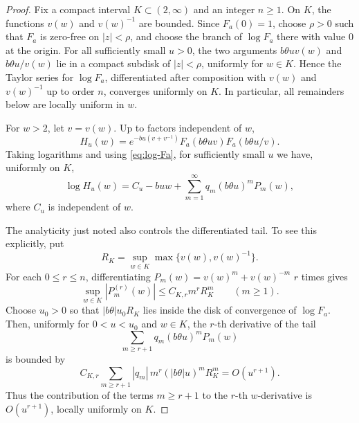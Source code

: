 \documentclass[10pt,a4paper]{amsart}
\begin{document}
\begin{proof}
Fix a compact interval \(K\subset(2,\infty)\) and an integer \(n\ge1\).  On \(K\), the functions \(v(w)\) and \(v(w)^{-1}\) are bounded.  Since \(F_a(0)=1\), choose \(\rho>0\) such that \(F_a\) is zero-free on \(|z|<\rho\), and choose the branch of \(\log F_a\) there with value \(0\) at the origin.  For all sufficiently small \(u>0\), the two arguments \(b\theta uv(w)\) and \(b\theta u/v(w)\) lie in a compact subdisk of \(|z|<\rho\), uniformly for \(w\in K\).  Hence the Taylor series for \(\log F_a\), differentiated after composition with \(v(w)\) and \(v(w)^{-1}\) up to order \(n\), converges uniformly on \(K\).  In particular, all remainders below are locally uniform in \(w\).

For \(w>2\), let \(v=v(w)\).  Up to factors independent of \(w\),
\begin{equation}
H_u(w)
=
e^{-bu(v+v^{-1})}
F_a(b\theta uv)F_a(b\theta u/v).
\end{equation}
Taking logarithms and using \eqref{eq:log-Fa}, for sufficiently small \(u\) we have, uniformly on \(K\),
\begin{equation}
\log H_u(w)
=
C_u-buw+
\sum_{m=1}^{\infty}q_m(b\theta u)^mP_m(w),
\end{equation}
where \(C_u\) is independent of \(w\).

The analyticity just noted also controls the differentiated tail.  To see this explicitly, put
\begin{equation}
R_K=\sup_{w\in K}\max\{v(w),v(w)^{-1}\}.
\end{equation}
For each \(0\le r\le n\), differentiating \(P_m(w)=v(w)^m+v(w)^{-m}\) \(r\) times gives
\begin{equation}
\sup_{w\in K}|P_m^{(r)}(w)|
\le C_{K,r}m^rR_K^m
\qquad(m\ge1).
\end{equation}
Choose \(u_0>0\) so that \(|b\theta|u_0R_K\) lies inside the disk of convergence of \(\log F_a\).  Then, uniformly for \(0<u<u_0\) and \(w\in K\), the \(r\)-th derivative of the tail
\begin{equation}
\sum_{m\ge r+1}q_m(b\theta u)^mP_m(w)
\end{equation}
is bounded by
\begin{equation}
C_{K,r}\sum_{m\ge r+1}|q_m|\,m^r(|b\theta|u)^mR_K^m
=O(u^{r+1}).
\end{equation}
Thus the contribution of the terms \(m\ge r+1\) to the \(r\)-th \(w\)-derivative is \(O(u^{r+1})\), locally uniformly on \(K\).


\end{proof}
\end{document}
